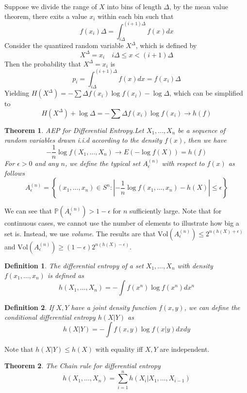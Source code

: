 \documentclass[10pt,landscape, a4paper]{article}
\newtheorem{definition}{Definition}
\newtheorem{theorem}{Theorem}
\begin{document}
\begin{multicols}{3}
Suppose we divide the range of $X$ into bins of length $\Delta$, by the mean value theorem, there exits a value $x_i$ within each bin such that
$$
f(x_i)\Delta =\int_{i\Delta}^{(i+1)\Delta} f(x)dx
$$
Consider the quantized random variable $X^\Delta$, which is defined by
$$
X^\Delta=x_i\quad i\Delta\le x<(i+1)\Delta
$$
Then the probability that $X^\Delta=x_i$ is
$$
p_i=\int_{i\Delta}^{(i+1)\Delta}f(x)dx=f(x_i)\Delta
$$
Yielding $H(X^\Delta)=-\sum \Delta f(x_i)\log f(x_i)-\log \Delta$, which can be simplified to
$$
H(X^\Delta)+\log \Delta=-\sum \Delta f(x_i)\log f(x_i)\rightarrow h(f)
$$

\begin{theorem}
    AEP for Differential Entropy.Let $X_1,\dots, X_n$ be a sequence of random variables drawn i.i.d according to the density $f(x)$, then we have
    $$
    -\frac{1}{n}\log f(X_1,\dots, X_n)\rightarrow E(-\log f(X))=h(f)
    $$
    For $\epsilon> 0$ and any $n$, we define the typical set $A_\epsilon^{(n)}$ with respect to $f(x)$ as follows
    $$
    A_\epsilon^{(n)}=\left\{(x_1,\dots, x_n)\in S^n: \left|-\frac{1}{n}\log f(x_1,\dots, x_n)-h(X)\right|\le \epsilon\right\}
    $$
\end{theorem}
We can see that $\mathbb{P}(A_\epsilon^{(n)})>1-\epsilon$ for $n$ sufficiently large. Note that for continuous cases, we cannot use the number of elements to illustrate how big a set is. Instead, we use \textit{volume}. The results are that $\text{Vol}(A_\epsilon^{(n)})\le 2^{n(h(X)+\epsilon)}$ and $\text{Vol}(A_\epsilon^{(n)})\ge (1-\epsilon)2^{n(h(X)-\epsilon)}$.


\begin{definition}
    The differential entropy of a set $X_1,\dots, X_n$ with density $f(x_1,\dots, x_n)$ is defined as
    $$
    h(X_1,\dots, X_n)=-\int f(x^n)\log f(x^n) dx^n
    $$
\end{definition}

\begin{definition}
    If $X,Y$ have a joint density function $f(x,y)$, we can define the conditional differential entropy $h(X|Y)$ as
    $$
    h(X|Y)=-\int f(x,y)\log f(x|y)dxdy
    $$
\end{definition}

  
Note that $h(X|Y)\le h(X)$ with equality iff $X,Y$ are independent.
  
\begin{theorem}
    The Chain rule for differential entropy
    $$
    h(X_1,\dots, X_n)=\sum_{i=1}^n h(X_i|X_1,\dots, X_{i-1})
    $$
\end{theorem}


\end{multicols}
\end{document}
